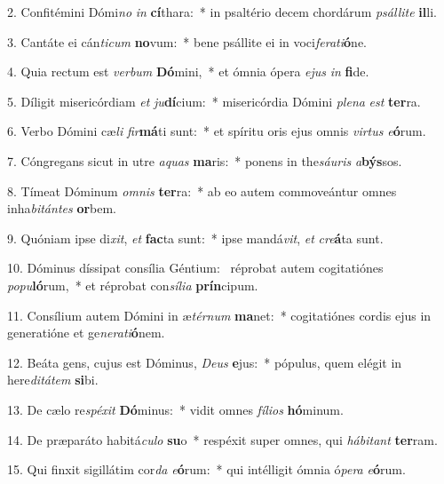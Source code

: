 2. Confitémini Dómi\textit{no} \textit{in} \textbf{cí}thara:~*  in psaltério decem chordárum \textit{psál}\textit{li}\textit{te} \textbf{il}li.\

3. Cantáte ei cán\textit{ti}\textit{cum} \textbf{no}vum:~*  bene psállite ei in voci\textit{fe}\textit{ra}\textit{ti}\textbf{ó}ne.\

4. Quia rectum est \textit{ver}\textit{bum} \textbf{Dó}mini,~*  et ómnia ópera \textit{e}\textit{jus} \textit{in} \textbf{fi}de.\

5. Díligit misericórdiam \textit{et} \textit{ju}\textbf{dí}cium:~*  misericórdia Dómini \textit{ple}\textit{na} \textit{est} \textbf{ter}ra.\

6. Verbo Dómini cæ\textit{li} \textit{fir}\textbf{má}ti sunt:~*  et spíritu oris ejus omnis \textit{vir}\textit{tus} \textit{e}\textbf{ó}rum.\

7. Cóngregans sicut in utre \textit{a}\textit{quas} \textbf{ma}ris:~*  ponens in the\textit{sáu}\textit{ris} \textit{a}\textbf{býs}sos.\

8. Tímeat Dóminum \textit{om}\textit{nis} \textbf{ter}ra:~*  ab eo autem commoveántur omnes inha\textit{bi}\textit{tán}\textit{tes} \textbf{or}bem.\

9. Quóniam ipse di\textit{xit}, \textit{et} \textbf{fac}ta sunt:~*  ipse mandá\textit{vit}, \textit{et} \textit{cre}\textbf{á}ta sunt.\

10. Dóminus díssipat consília Géntium: \dag\  réprobat autem cogitatiónes \textit{po}\textit{pu}\textbf{ló}rum,~*  et réprobat con\textit{sí}\textit{li}\textit{a} \textbf{prín}cipum.\

11. Consílium autem Dómini in æ\textit{tér}\textit{num} \textbf{ma}net:~*  cogitatiónes cordis ejus in generatióne et ge\textit{ne}\textit{ra}\textit{ti}\textbf{ó}nem.\

12. Beáta gens, cujus est Dóminus, \textit{De}\textit{us} \textbf{e}jus:~*  pópulus, quem elégit in here\textit{di}\textit{tá}\textit{tem} \textbf{si}bi.\

13. De cælo re\textit{spé}\textit{xit} \textbf{Dó}minus:~*  vidit omnes \textit{fí}\textit{li}\textit{os} \textbf{hó}minum.\

14. De præparáto habitá\textit{cu}\textit{lo} \textbf{su}o~*  respéxit super omnes, qui \textit{há}\textit{bi}\textit{tant} \textbf{ter}ram.\

15. Qui finxit sigillátim cor\textit{da} \textit{e}\textbf{ó}rum:~*  qui intélligit ómnia ó\textit{pe}\textit{ra} \textit{e}\textbf{ó}rum.\

